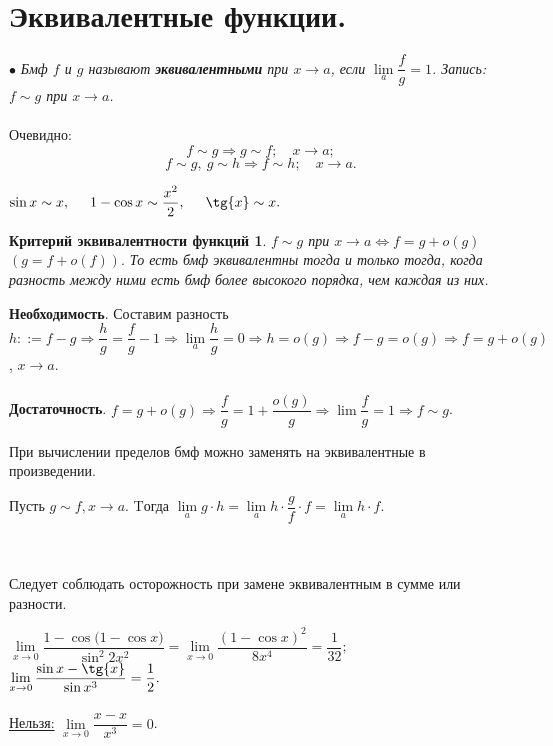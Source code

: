 \section{Эквивалентные функции.}
$\bullet$ \textit{Бмф $f$ и $g$ называют \textbf{эквивалентными} при $x \rightarrow a$, если $\lim\limits_{a} \dfrac{f}{g} = 1$. Запись: $f \sim g$ при $x \rightarrow a$.}\\\\
Очевидно: $$f \sim g \Rightarrow g \sim f; \quad x \rightarrow a;$$
$$f \sim g,\ g \sim h \Rightarrow f \sim h; \quad x \rightarrow a.$$
\begin{example}
	$\sin{x} \sim x, \hspace{0.5 cm} 1 - \cos{x} \sim \dfrac{x^2}{2}, \hspace{0.5 cm} \tg{x} \sim x.$
\end{example}
\newtheorem*{keq}{Критерий эквивалентности функций}
\begin{keq} 
	$f \sim g$ при $x \rightarrow a \Longleftrightarrow f = g + o(g)$ $(g = f + o(f)).$ То есть бмф эквивалентны тогда и только тогда, когда разность между ними есть бмф более высокого порядка, чем каждая из них.
\end{keq}
\begin{Proof}
	\textbf{Необходимость}. Составим разность $h ::= f - g \Rightarrow \dfrac{h}{g} = \dfrac{f}{g} - 1 \Rightarrow \lim\limits_{a} \dfrac{h}{g} = 0 \Rightarrow h = o(g) \Rightarrow f - g = o(g) \Rightarrow f = g + o(g)$, $x \rightarrow a$.\\\\
	\textbf{Достаточность}. $f = g + o(g) \Rightarrow \dfrac{f}{g} = 1 + \dfrac{o(g)}{g} \Rightarrow \lim\dfrac{f}{g} = 1 \Rightarrow f \sim g$.
\end{Proof}
\begin{theorem}
	При вычислении пределов бмф можно заменять на эквивалентные в произведении.
\end{theorem}
\begin{Proof}
	Пусть $g \sim f, x \rightarrow a$. Tогда $\lim\limits_{a}g\cdot h = \lim\limits_{a}h \cdot \dfrac{g}{f}\cdot f = \lim\limits_{a}h\cdot f$.
\end{Proof}\\\\
Следует соблюдать осторожность при замене эквивалентным в сумме или разности.\\
\begin{example}
	$\lim\limits_{x \rightarrow 0} \dfrac{1 - \cos{(1 - \cos{x}})}{\sin^2{2x^2}} = \lim\limits_{x \rightarrow 0} \dfrac{(1 - \cos{x})^2}{8 x^4} = \dfrac{1}{32};$\\
	$\lim\limits_{x \rightarrow 0} \dfrac{\sin{x} - \tg{x}}{\sin{x^3}} = \dfrac{1}{2}.$\\\\
	\underline{Нельзя:} $\lim\limits_{x \rightarrow 0} \dfrac{x - x}{x^3} = 0$.
\end{example}

